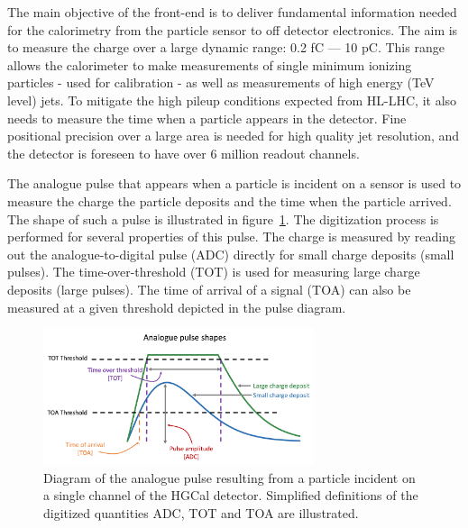 \documentclass[twocolumn]{webofc}
\begin{document}
The main objective of the front-end is to deliver fundamental information needed for the calorimetry from the particle sensor to off detector electronics. The aim is to measure the charge over a large dynamic range: 0.2 fC — 10 pC. This range allows the calorimeter to make measurements of single minimum ionizing particles - used for calibration - as well as measurements of high energy (TeV level) jets. To mitigate the high pileup conditions expected from HL-LHC, it also needs to measure the time when a particle appears in the detector. Fine positional precision over a large area is needed for high quality jet resolution, and the detector is foreseen to have over 6 million readout channels.

The analogue pulse that appears when a particle is incident on a sensor is used to measure the charge the particle deposits and the time when the particle arrived. The shape of such a pulse is illustrated in figure~\ref{fig:pulse}. The digitization process is performed for several properties of this pulse. The charge is measured by reading out the analogue-to-digital pulse (ADC) directly for small charge deposits (small pulses). The time-over-threshold (TOT) is used for measuring large charge deposits (large pulses). The time of arrival of a signal (TOA) can also be measured at a given threshold depicted in the pulse diagram.

\begin{figure}[ht!]
\centering
\includegraphics[height=4cm]{figures/PulseShape.png}
\caption{Diagram of the analogue pulse resulting from a particle incident on a single channel of the HGCal detector. Simplified definitions of the digitized quantities ADC, TOT and TOA are illustrated.}
\label{fig:pulse}
\vspace*{-1cm}
\end{figure}
\end{document}
